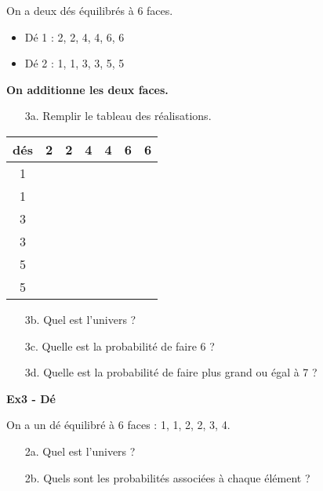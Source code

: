 \begin{multicols}{2}\noindent
On a deux dés équilibrés à 6 faces. 

\begin{itemize}[label={$\bullet$}]
  \item Dé 1 : 2, 2, 4, 4, 6, 6
  \item Dé 2 : 1, 1, 3, 3, 5, 5 
\end{itemize} 

\textbf{On additionne les deux faces.} 
\begin{enumerate}
  \item[3a.] Remplir le tableau des réalisations.
\end{enumerate}  
\columnbreak 

\begin{center}\begin{tabular}{|c|c|c|c|c|c|c|} \hline
  dés & 2 & 2 & 4 & 4 & 6 & 6 \\  \hline
    1 &   &   &   &   &   &   \\  \hline
    1 &   &   &   &   &   &   \\  \hline
    3 &   &   &   &   &   &   \\  \hline
    3 &   &   &   &   &   &   \\  \hline
    5 &   &   &   &   &   &   \\  \hline
    5 &   &   &   &   &   &   \\  \hline
\end{tabular}\end{center}

\end{multicols}

\begin{enumerate}
  \item[3b.] Quel est l'univers ? \\ \Pointilles[2] 
  \item[3c.] Quelle est la probabilité de faire 6 ? \\ \Pointilles[2] 
  \item[3d.] Quelle est la probabilité de faire plus grand ou égal à 7 ? \\ \Pointilles[3]  
\end{enumerate}  

\textbf{Ex3 - Dé}

On a un dé équilibré à 6 faces : 1, 1, 2, 2, 3, 4.

\begin{enumerate}
  \item[2a.] Quel est l'univers ? \\ \Pointilles[2]
  \item[2b.] Quels sont les probabilités associées à chaque élément ? \\ \Pointilles[3]
\end{enumerate}  


